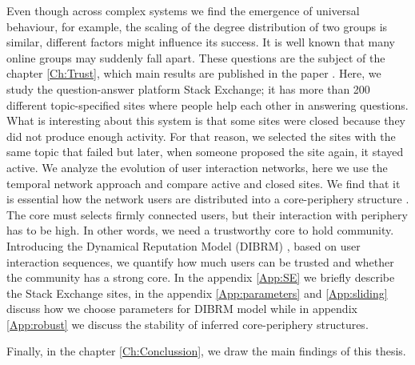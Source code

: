 Even though across complex systems we find the emergence of universal behaviour, for example, the scaling of the degree distribution of two groups is similar, different factors might influence its success. It is well known that many online groups may suddenly fall apart. These questions are the subject of the chapter \ref{Ch:Trust}, which main results are published in the paper \cite{vranic2022sustainability}. Here, we study the question-answer platform Stack Exchange; it has more than 200 different topic-specified sites where people help each other in answering questions. What is interesting about this system is that some sites were closed because they did not produce enough activity. For that reason, we selected the sites with the same topic that failed but later, when someone proposed the site again, it stayed active. We analyze the evolution of user interaction networks, here we use the temporal network approach and compare active and closed sites. We find that it is essential how the network users are distributed into a core-periphery structure \cite{gallagher2020clarified}. The core must selects firmly connected users, but their interaction with periphery has to be high. In other words, we need a trustworthy core to hold community. Introducing the Dynamical Reputation Model (DIBRM) \cite{melnikov2018toward}, based on user interaction sequences, we quantify how much users can be trusted and whether the community has a strong core. In the appendix \ref{App:SE} we briefly describe the Stack Exchange sites, in the appendix \ref{App:parameters} and \ref{App:sliding} discuss how we choose parameters  for DIBRM model while in appendix \ref{App:robust} we discuss the stability of inferred core-periphery structures. 

Finally, in the chapter \ref{Ch:Conclussion}, we draw the main findings of this thesis. 










